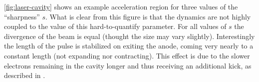 \ref{fig:laser-cavity} shows an example acceleration region for three values of the ``sharpness'' $s$.
What is clear from this figure is that the dynamics are not highly coupled to the value of this hard-to-quantify parameter.
For all values of $s$ the divergence of the beam is equal (thought the size may vary slightly).
Interestingly the length of the pulse is stabilized on exiting the anode, coming very nearly to a constant length (not expanding nor contracting).
This effect is due to the slower electrons remaining in the cavity longer and thus receiving an additional kick, as described in \cite{oudheusden_electron_2007}.
